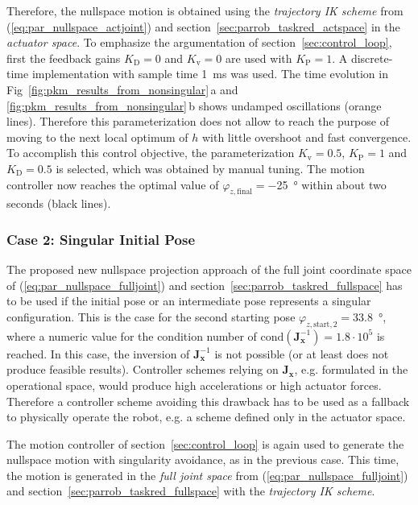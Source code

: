 \documentclass[a4paper,twoside]{article}
\begin{document}
Therefore, the nullspace motion is obtained using the \emph{trajectory IK scheme} from (\ref{eq:par_nullspace_actjoint}) and section~\ref{sec:parrob_taskred_actspace} in the \emph{actuator space}.
To emphasize the argumentation of section~\ref{sec:control_loop}, first the feedback gains $K_\mathrm{D}=0$ and $K_\mathrm{v}=0$ are used with $K_\mathrm{P}=1$.
A discrete-time implementation with sample time \SI{1}{\milli\second} was used.
The time evolution in Fig~\ref{fig:pkm_results_from_nonsingular}\,a and \ref{fig:pkm_results_from_nonsingular}\,b shows undamped oscillations (orange lines).
Therefore this parameterization does not allow to reach the purpose of moving to the next local optimum of $h$ with little overshoot and fast convergence.
%
To accomplish this control objective, the parameterization $K_\mathrm{v}{=}0.5$, $K_\mathrm{P}{=}1$ and $K_\mathrm{D}{=}0.5$ is selected, which was obtained by manual tuning.
The motion controller now reaches the optimal value of $\varphi_{z,\mathrm{final}}{=}$\SI{-25}{\degree} within about two seconds (black lines).


\subsubsection{Case 2: Singular Initial Pose}
\label{sec:eval_case2}

The proposed new nullspace projection approach of the full joint coordinate space of (\ref{eq:par_nullspace_fulljoint}) and section~\ref{sec:parrob_taskred_fullspace} has to be used if the initial pose or an intermediate pose represents a singular configuration.
This is the case for the second starting pose $\varphi_{z,\mathrm{start},2}{=}$\SI{33.8}{\degree}, where a numeric value for the condition number of $\mathrm{cond}(\bm{J}_{\bm{x}}^{-1})=1.8 \cdot 10^5$ is reached.
In this case, the inversion of $\bm{J}_{\bm{x}}^{-1}$ is not possible (or at least does not produce feasible results).
Controller schemes relying on $\bm{J}_{\bm{x}}$, e.g. formulated in the operational space, would produce high accelerations or high actuator forces.
Therefore a controller scheme avoiding this drawback has to be used as a fallback to physically operate the robot, e.g. a scheme defined only in the actuator space.

The motion controller of section~\ref{sec:control_loop} is again used to generate the nullspace motion with singularity avoidance, as in the previous case.
This time, the motion is generated in the \emph{full joint space} from (\ref{eq:par_nullspace_fulljoint}) and section~\ref{sec:parrob_taskred_fullspace} with the \emph{trajectory IK scheme}.
\end{document}
